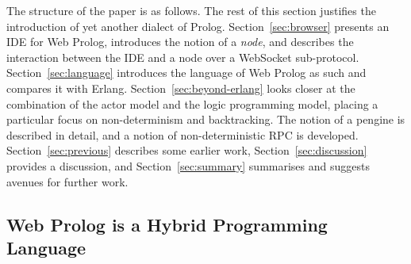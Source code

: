 \documentclass{tlp}
\begin{document}

%
%
%

The structure of the paper is as follows. The rest of this section justifies the introduction of yet another dialect of Prolog. Section~\ref{sec:browser} presents an IDE for Web Prolog, introduces the notion of a \textit{node}, and describes the interaction between the IDE and a node over a WebSocket sub-protocol. Section~\ref{sec:language} introduces the language of Web Prolog as such and compares it with Erlang. Section~\ref{sec:beyond-erlang} looks closer at the combination of the actor model and the logic programming model, placing a particular focus on non-determinism and backtracking. The notion of a pengine is described in detail, and a notion of non-deterministic RPC is developed. Section~\ref{sec:previous} describes some earlier work, Section~\ref{sec:discussion} provides a discussion, and Section~\ref{sec:summary} summarises and suggests avenues for further work.


\vspace{-2mm}

\subsection{Web Prolog is a Hybrid Programming Language}\label{sec:hybrid}

%
\end{document}
